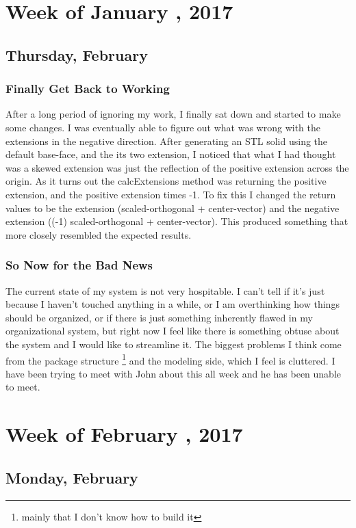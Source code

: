 \documentclass[letterpaper,oneside,titlepage]{article}
\begin{document}
\section{Week of January , 2017}


\subsection{Thursday, February }

\subsubsection{Finally Get Back to Working}
After a long period of ignoring my work, I finally sat down and started to make some changes.  I was eventually able to figure out what was wrong with the extensions in the negative direction.  After generating an STL solid using the default base-face, and the its two extension, I noticed that what I had thought was a skewed extension was just the reflection of the positive extension across the origin.  As it turns out the calcExtensions method was returning the positive extension, and the positive extension times -1.  To fix this I changed the return values to be the extension (scaled-orthogonal + center-vector) and the negative extension ((-1) scaled-orthogonal + center-vector).  This produced something that more closely resembled the expected results.

\subsubsection{So Now for the Bad News}
The current state of my system is not very hospitable.  I can't tell if it's just because I haven't touched anything in a while, or I am overthinking how things should be organized, or if there is just something inherently flawed in my organizational system, but right now I feel like there is something obtuse about the system and I would like to streamline it.  The biggest problems I think come from the package structure \footnote{mainly that I don't know how to build it} and the modeling side, which I feel is cluttered.  I have been trying to meet with John about this all week and he has been unable to meet.


\section{Week of February , 2017}

\subsection{Monday, February }
\end{document}
